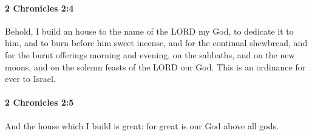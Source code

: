 		\paragraph{2 Chronicles 2:4} %
			\label{2CHRONICLES-2-4}

			Behold, I build an house to the name of the LORD my God, to dedicate it to him, and to burn before him sweet incense, and for the continual shewbread, and for the burnt offerings morning and evening, on the sabbaths, and on the new moons, and on the solemn feasts of the LORD our God. This is an ordinance for ever to Israel.


		\paragraph{2 Chronicles 2:5} %
			\label{2CHRONICLES-2-5}

			And the house which I build is great: for great is our God above all gods.

